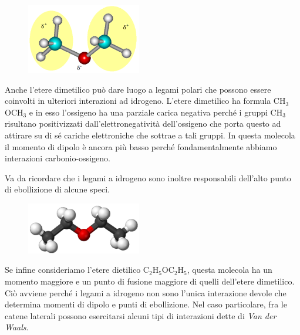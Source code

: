 \hspace{0.5cm}\begin{minipage}{0.35 \textwidth}
    \begin{figure}[H]
        \includegraphics[width=5cm]{immagini/etere_dimetilico.png}
    \end{figure}
\end{minipage}
\begin{minipage}{0.6 \textwidth}
    \vspace{0.6cm}Anche l'etere dimetilico può dare luogo a legami polari che possono essere coinvolti in ulteriori interazioni ad idrogeno. L'etere dimetilico ha formula CH$_3$OCH$_3$ e in esso l'ossigeno ha una parziale carica negativa perché i gruppi CH$_3$ risultano positivizzati dall'elettronegatività dell'ossigeno che porta questo ad attirare su di sé cariche elettroniche che sottrae a tali gruppi. In questa molecola il momento di dipolo è ancora più basso perché fondamentalmente abbiamo interazioni carbonio-ossigeno.
\end{minipage}

\vspace{0.2cm}Va da ricordare che i legami a idrogeno sono inoltre responsabili dell'alto punto di ebollizione di alcune speci.

\hspace{0.5cm}\begin{minipage}{0.35 \textwidth}
    \begin{figure}[H]
        \includegraphics[width=5cm]{immagini/etere_dietilico.png}
    \end{figure}
\end{minipage}
\begin{minipage}{0.6 \textwidth}
    \vspace{0.6cm}Se infine consideriamo l'etere dietilico C$_2$H$_5$OC$_2$H$_5$, questa molecola ha un momento maggiore e un punto di fusione maggiore di quelli dell'etere dimetilico. Ciò avviene perché i legami a idrogeno non sono l'unica interazione devole che determina momenti di dipolo e punti di ebollizione. Nel caso particolare, fra le catene laterali possono esercitarsi alcuni tipi di interazioni dette di \textit{Van der Waals}.
\end{minipage}

